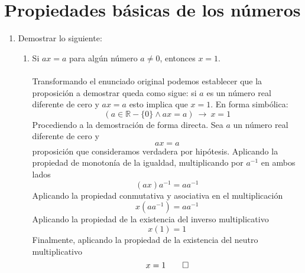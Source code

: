 \chapter{Propiedades básicas de los números}

\begin{enumerate}
    \item Demostrar lo siguiente:
    \begin{enumerate}[label=\roman*.]
        \item Si $ ax = a $ para algún número $ a \neq 0 $, entonces $ x = 1 $. \\
        \solucion \\
        Transformando el enunciado original podemos establecer que la proposición a demostrar queda como sigue: si $a$ es un número real diferente de cero y $ax=a$ esto implica que $x=1$. En forma simbólica:
        \begin{displaymath}
            \left( a \in \mathbb{R}-\{ 0 \} \wedge ax = a \right) \ \longrightarrow \ x = 1
        \end{displaymath}
        Procediendo a la demostración de forma directa. Sea $ a $ un número real diferente de cero y
        \begin{displaymath}
            ax = a
        \end{displaymath}
        proposición que consideramos verdadera por hipótesis. Aplicando la propiedad de monotonía de la igualdad, multiplicando por $ a^{-1} $ en ambos lados
        \begin{displaymath}
            (ax)a^{-1} = a a^{-1}
        \end{displaymath}
        Aplicando la propiedad conmutativa y asociativa en el multiplicación
        \begin{displaymath}
            x(a a^{-1}) = a a^{-1}
        \end{displaymath}
        Aplicando la propiedad de la existencia del inverso multiplicativo
        \begin{displaymath}
            x(1) = 1
        \end{displaymath}
        Finalmente, aplicando la propiedad de la existencia del neutro multiplicativo
        \begin{displaymath}
            x = 1 \qed
        \end{displaymath}
        

\end{enumerate}
\end{enumerate}
